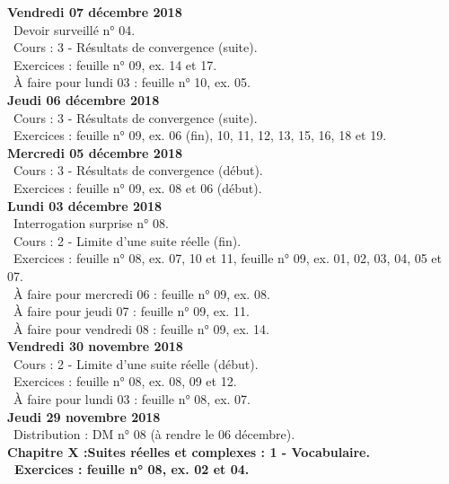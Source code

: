 \documentclass[12pt,a4paper]{article}
\begin{document}
\noindent\textbf{Vendredi 07 décembre 2018}\\
\bu\ Devoir surveillé n° 04.\\
\bu\ Cours : 3 - Résultats de convergence (suite).\\
\bu\ Exercices : feuille n° 09, ex. 14 et 17.\\
\bu\ À faire pour lundi 03 : feuille n° 10, ex. 05.\vspace{.4cm}\\
 
\noindent\textbf{Jeudi 06 décembre 2018}\\
\bu\ Cours : 3 - Résultats de convergence (suite).\\
\bu\ Exercices : feuille n° 09, ex. 06 (fin), 10, 11, 12, 13, 15, 16, 18 et 19.\vspace{.4cm}\\
 
\noindent\textbf{\bf Mercredi 05 décembre 2018}\\
\bu\ Cours : 3 - Résultats de convergence (début).\\
\bu\ Exercices : feuille n° 09, ex. 08 et 06 (début).\vspace{.4cm}\\
 
\noindent\textbf{Lundi 03 décembre 2018}\\
\bu\ Interrogation surprise n° 08.\\
\bu\ Cours : 2 - Limite d'une suite réelle (fin).\\
\bu\ Exercices : feuille n° 08, ex. 07, 10 et 11, feuille n° 09, ex. 01, 02, 03, 04, 05 et 07.\\
\bu\ À faire pour mercredi 06 : feuille n° 09, ex. 08.\\
\bu\ À faire pour jeudi 07 : feuille n° 09, ex. 11.\\
\bu\ À faire pour vendredi 08 : feuille n° 09, ex. 14.\vspace{.4cm}\\
 
\noindent\textbf{Vendredi 30 novembre 2018}\\
\bu\ Cours : 2 - Limite d'une suite réelle (début).\\
\bu\ Exercices : feuille n° 08, ex. 08, 09 et 12.\\
\bu\ À faire pour lundi 03 : feuille n° 08, ex. 07.\vspace{.4cm}\\
 
\noindent\textbf{Jeudi 29 novembre 2018}\\
\bu\ Distribution : DM n° 08 (à rendre le 06 décembre).\\
\bf Chapitre X :\rm Suites réelles et complexes : 1 - Vocabulaire.\\
\bu\ Exercices : feuille n° 08, ex. 02 et 04.\vspace{.4cm}\\
 
\end{document}

